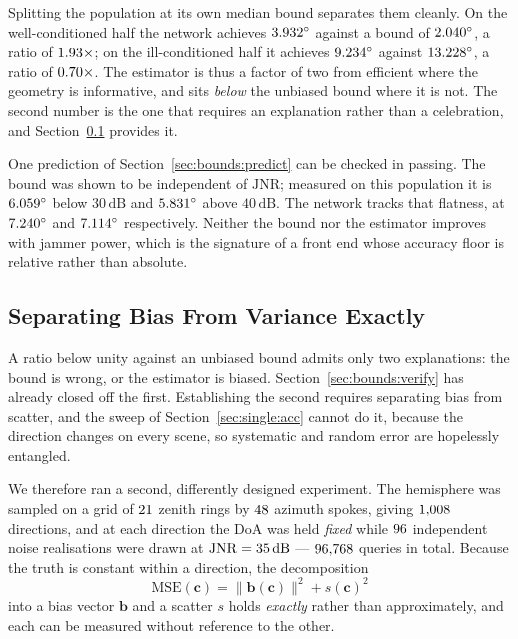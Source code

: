 \documentclass[journal]{IEEEtran}
\newcommand{\JNR}{\mathrm{JNR}}
\newcommand{\dB}{\,\mathrm{dB}}
\newcommand{\degs}{^\circ}
\begin{document}
Splitting the population at its own median bound separates them cleanly. On
the well-conditioned half the network achieves $\effWellRmse\degs$ against a
bound of $\effWellCrb\degs$, a ratio of $1.93\times$; on the
ill-conditioned half it achieves $\effIllRmse\degs$ against
$\effIllCrb\degs$, a ratio of $0.70\times$. The estimator is thus a
factor of two from efficient where the geometry is informative, and sits
\emph{below} the unbiased bound where it is not. The second number is the one
that requires an explanation rather than a celebration, and
Section~\ref{sec:single:bias} provides it.

One prediction of Section~\ref{sec:bounds:predict} can be checked in passing.
The bound was shown to be independent of $\JNR$; measured on this population
it is $\crbJnrLo\degs$ below $30\dB$ and $\crbJnrHi\degs$ above $40\dB$. The
network tracks that flatness, at $\netRmseJnrLo\degs$ and
$\netRmseJnrHi\degs$ respectively. Neither the bound nor the estimator
improves with jammer power, which is the signature of a front end whose
accuracy floor is relative rather than absolute.

\subsection{Separating Bias From Variance Exactly}
\label{sec:single:bias}

A ratio below unity against an unbiased bound admits only two explanations:
the bound is wrong, or the estimator is biased. Section~\ref{sec:bounds:verify}
has already closed off the first. Establishing the second requires separating
bias from scatter, and the sweep of Section~\ref{sec:single:acc} cannot do it,
because the direction changes on every scene, so systematic and random error
are hopelessly entangled.

We therefore ran a second, differently designed experiment. The hemisphere was
sampled on a grid of $21$ zenith rings by $48$ azimuth spokes,
giving $1{,}008$ directions, and at each direction the DoA was held
\emph{fixed} while $96$ independent noise realisations were drawn at
$\JNR = \fdJnr\dB$ --- $96{,}768$ queries in total. Because the truth is
constant within a direction, the decomposition
\begin{equation}
\mathrm{MSE}(\mathbf{c})
= \big\|\mathbf{b}(\mathbf{c})\big\|^2 + s(\mathbf{c})^2
\label{eq:biasvar}
\end{equation}
into a bias vector $\mathbf{b}$ and a scatter $s$ holds \emph{exactly} rather
than approximately, and each can be measured without reference to the other.
\end{document}
